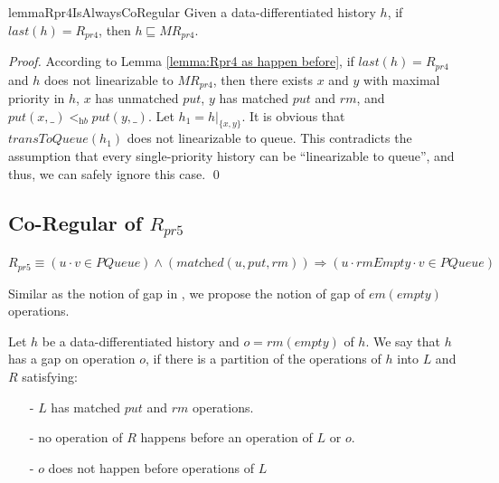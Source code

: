 \begin{restatable}{lemma}{Rpr4IsAlwaysCoRegular}
\label{lemma:Rpr4 is always co-regular}
Given a data-differentiated history $h$, if $\textit{last}(h) = R_{\textit{pr4}}$, then $h \sqsubseteq \textit{MR}_{\textit{pr4}}$.
\end{restatable}

\begin {proof}

According to Lemma \ref{lemma:Rpr4 as happen before}, if $\textit{last}(h) = R_{\textit{pr4}}$ and $h$ does not linearizable to $\textit{MR}_{\textit{pr4}}$, then there exists $x$ and $y$ with maximal priority in $h$, $x$ has unmatched $\textit{put}$, $y$ has matched $\textit{put}$ and $\textit{rm}$, and $\textit{put}(x,\_) <_{\textit{hb}} \textit{put}(y,\_)$. Let $h_1 = h \vert_{ \{ x,y \} }$. It is obvious that $\textit{transToQueue}(h_1)$ does not linearizable to queue. This contradicts the assumption that every single-priority history can be ``linearizable to queue'', and thus, we can safely ignore this case. \qed
\end {proof}




\subsection{Co-Regular of $R_{\textit{pr5}}$}
\label{subsec:co-regular of Rpr5}

$R_{\textit{pr5}} \equiv (u \cdot v \in \textit{PQueue}) \wedge (\textit{matched}(u,\textit{put},\textit{rm}) ) \Rightarrow (u \cdot \textit{rmEmpty} \cdot v \in \textit{PQueue})$

Similar as the notion of gap in \cite{Bouajjani:2015}, we propose the notion of gap of $\textit{em}(\textit{empty})$ operations.

\begin{definition}\label{def:gap for rmEmpty operations}

Let $h$ be a data-differentiated history and $o = \textit{rm}(\textit{empty})$ of $h$. We say that $h$ has a gap on operation $o$, if there is a partition of the operations of $h$ into $L$ and $R$ satisfying:
\begin{itemize}
\setlength{\itemsep}{0.5pt}
\item[-] $L$ has matched $\textit{put}$ and $\textit{rm}$ operations.

\item[-] no operation of $R$ happens before an operation of $L$ or $o$.

\item[-] $o$ does not happen before operations of $L$
\end{itemize}
\end{definition}

